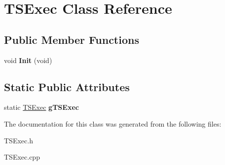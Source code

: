 \hypertarget{classTSExec}{\section{\-T\-S\-Exec \-Class \-Reference}
\label{classTSExec}
}
\subsection*{\-Public \-Member \-Functions}
\begin{DoxyCompactItemize}
\item 
\hypertarget{classTSExec_a30a7892f85a414658a37ca1db88eacb3}{void {\bfseries \-Init} (void)}\label{classTSExec_a30a7892f85a414658a37ca1db88eacb3}

\end{DoxyCompactItemize}
\subsection*{\-Static \-Public \-Attributes}
\begin{DoxyCompactItemize}
\item 
\hypertarget{classTSExec_a6c2bf008825ec4bfbaf3d3af07fc2c43}{static \hyperlink{classTSExec}{\-T\-S\-Exec} {\bfseries g\-T\-S\-Exec}}\label{classTSExec_a6c2bf008825ec4bfbaf3d3af07fc2c43}

\end{DoxyCompactItemize}


\-The documentation for this class was generated from the following files\-:\begin{DoxyCompactItemize}
\item 
\-T\-S\-Exec.\-h\item 
\-T\-S\-Exec.\-cpp\end{DoxyCompactItemize}
